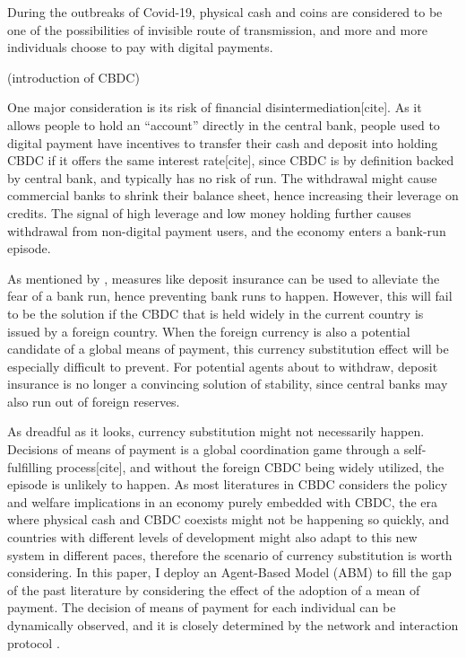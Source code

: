 During the outbreaks of Covid-19, physical cash and coins are considered to be
one of the possibilities of invisible route of transmission, and more and more
individuals choose to pay with digital payments.
\begin{center}
    (introduction of CBDC)
\end{center}
One major consideration is its risk of financial disintermediation[cite].  As it
allows people to hold an ``account'' directly in the central bank, people used
to digital payment have incentives to transfer their cash and deposit into
holding CBDC if it offers the same interest rate[cite], since CBDC is by
definition backed by central bank, and typically has no risk of run. The
withdrawal might cause commercial banks to shrink their balance sheet, hence
increasing their leverage on credits.  The signal of high leverage and low money
holding further causes withdrawal from non-digital payment users, and the
economy enters a bank-run episode.

As mentioned by \citet*{DD83}, measures like deposit insurance can be used to
alleviate the fear of a bank run, hence preventing bank runs to happen. However,
this will fail to be the solution if the CBDC that is held widely in the current
country is issued by a foreign country. When the foreign currency is also a
potential candidate of a global means of payment, this currency substitution
effect will be especially difficult to prevent.
For potential agents about to withdraw, deposit insurance is no longer a
convincing solution of stability, since central banks may also run out of foreign reserves.

As dreadful as it looks, currency substitution might not necessarily happen.
Decisions of means of payment is a global coordination game through a
self-fulfilling process[cite], and without the foreign CBDC being widely
utilized, the episode is unlikely to happen.
As most literatures in CBDC considers the policy and welfare implications in an
economy purely embedded with CBDC, the era where physical cash and CBDC coexists
might not be happening so quickly, and countries with different levels of
development might also adapt to this new system in different paces, therefore the
scenario of currency substitution is worth considering.
In this paper, I deploy an Agent-Based Model (ABM) to fill the gap of the past
literature by considering the effect of the adoption of a mean of payment. The
decision of means of payment for each individual can be dynamically observed,
and it is closely determined by the network and interaction protocol \citep*{KW98}.

